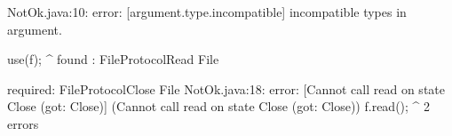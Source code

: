 \lstset{caption=Original Mungo output}
\begin{code}
\end{code}

\lstset{caption=New Mungo output}
\begin{code}
NotOk.java:10: error: [argument.type.incompatible] incompatible types in argument.

        use(f);
            ^
  found   : FileProtocol{Read} File

  required: FileProtocol{Close} File
NotOk.java:18: error: [Cannot call read on state Close (got: Close)] (Cannot call read on state Close (got: Close))
    f.read();
          ^
2 errors
\end{code}

